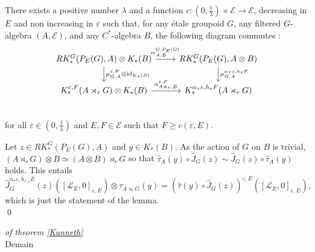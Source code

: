 \begin{lem}
There exists a positive number $\lambda$ and a function $c : (0,\frac{1}{\lambda})\times\mathcal E\rightarrow \mathcal E$, decreasing in $E$ and non increasing in $\varepsilon$ such that, for any étale groupoid $G$, any filtered $G$-algebra $(A,\mathcal E)$, and any $C^*$-algebra $B$, the following diagram commutes :
\[\begin{tikzcd}
RK_*^G(P_E(G),A)\otimes K_*(B) \arrow{r}{\alpha^{G,P_E(G)}_{A,B}}\arrow{d}{\mu_{G,A}^{\varepsilon,F}\otimes \text{id}_{K_*(B)}} & 
RK_*^G(P_E(G),A\otimes B) \arrow{d}{\mu_{G,A}^{\alpha_ \tau\varepsilon,h_\varepsilon F}} \\
K_*^{\varepsilon,F}(A\rtimes_r G)\otimes K_*(B) \arrow{r}{\alpha_{A\rtimes_r,B}^{\varepsilon,F}} & 
K_*^{\alpha_\tau\varepsilon,h_{\varepsilon}F}(A\rtimes_r G)\\
\end{tikzcd}\] 
for all $\varepsilon\in(0,\frac{1}{\lambda})$ and $E,F\in\mathcal E$ such that $F\geq c(\varepsilon,E)$. 
\end{lem}

\begin{dem}
Let $z\in RK_*^G(P_E(G),A)$ and $y\in K_*(B)$. As the action of $G$ on $B$ is trivial, $(A\rtimes_r G)\otimes B\simeq (A\otimes B)\rtimes_r G$ so that $\hat\tau_A(y)\circ \hat J_{G}(z) \sim \hat J_{G}(z)\circ \hat\tau_A(y) $ holds. This entails
\[\hat J_G^{\alpha_\tau\varepsilon, h_{\tau,\varepsilon}E}(z)\left([\mathcal L_E,0]_{\varepsilon, E} \right)\otimes \tau_{A\rtimes_r G}(y) = 
\left( \hat\tau(y)\circ \hat J_G(z) \right)^{\varepsilon, E}\left([\mathcal L_E,0]_{\varepsilon, E}\right),\]
which is just the statement of the lemma.\\
\qed
\end{dem}


\begin{dem} \textit{of theorem \ref{Kunneth}}\\
Demain
\end{dem}




























